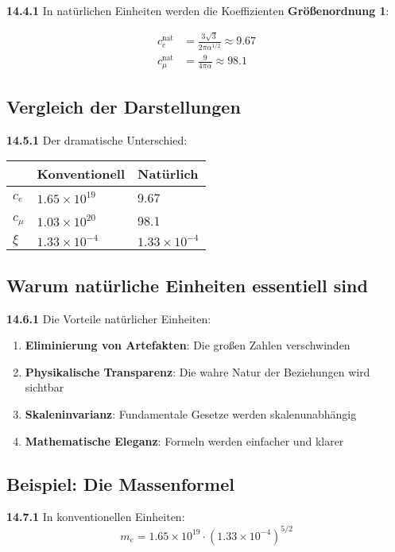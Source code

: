 \documentclass[12pt,a4paper]{article}
\begin{document}
\noindent \textbf{14.4.1} In natürlichen Einheiten werden die Koeffizienten \textbf{Größenordnung 1}:

\begin{align*}
	c_e^{\text{nat}} &= \frac{3\sqrt{3}}{2\pi\alpha^{1/2}} \approx 9.67 \\
	c_\mu^{\text{nat}} &= \frac{9}{4\pi\alpha} \approx 98.1
\end{align*}

\subsection{Vergleich der Darstellungen}

\noindent \textbf{14.5.1} Der dramatische Unterschied:

\begin{tabular}{lll}
	& Konventionell & Natürlich \\
	\midrule
	$c_e$ & $1.65 \times 10^{19}$ & 9.67 \\
	$c_\mu$ & $1.03 \times 10^{20}$ & 98.1 \\
	$\xi$ & $1.33 \times 10^{-4}$ & $1.33 \times 10^{-4}$ \\
\end{tabular}

\subsection{Warum natürliche Einheiten essentiell sind}

\noindent \textbf{14.6.1} Die Vorteile natürlicher Einheiten:
\begin{enumerate}
	\item \textbf{Eliminierung von Artefakten}: Die großen Zahlen verschwinden
	\item \textbf{Physikalische Transparenz}: Die wahre Natur der Beziehungen wird sichtbar
	\item \textbf{Skaleninvarianz}: Fundamentale Gesetze werden skalenunabhängig
	\item \textbf{Mathematische Eleganz}: Formeln werden einfacher und klarer
\end{enumerate}

\subsection{Beispiel: Die Massenformel}

\noindent \textbf{14.7.1} In konventionellen Einheiten:
\[
m_e = 1.65 \times 10^{19} \cdot (1.33 \times 10^{-4})^{5/2}
\]
\end{document}
